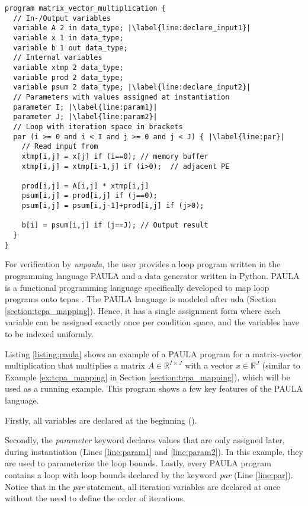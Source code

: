 \begin{lstlisting}[style=my_PAULA_style, float, escapechar=|, label=listing:paula, captionpos=b,
  caption=PAULA Code multiplying a matrix $A \in \mathbb{R}^{I \times J}$ with a vector $x \in \mathbb{R}^J$ and storing the result in vector $b \in \mathbb{R}^I$.]
program matrix_vector_multiplication {
  // In-/Output variables
  variable A 2 in data_type; |\label{line:declare_input1}|  
  variable x 1 in data_type;  
  variable b 1 out data_type; 
  // Internal variables
  variable xtmp 2 data_type;
  variable prod 2 data_type;
  variable psum 2 data_type; |\label{line:declare_input2}|  
  // Parameters with values assigned at instantiation
  parameter I; |\label{line:param1}|  
  parameter J; |\label{line:param2}| 
  // Loop with iteration space in brackets
  par (i >= 0 and i < I and j >= 0 and j < J) { |\label{line:par}|
    // Read input from
    xtmp[i,j] = x[j] if (i==0); // memory buffer
    xtmp[i,j] = xtmp[i-1,j] if (i>0);  // adjacent PE

    prod[i,j] = A[i,j] * xtmp[i,j]  
    psum[i,j] = prod[i,j] if (j==0);
    psum[i,j] = psum[i,j-1]+prod[i,j] if (j>0);

    b[i] = psum[i,j] if (j==J); // Output result
  }
}
\end{lstlisting}

For verification by \textit{unpaula}, the user provides a loop program written in the programming language PAULA and a data generator written in Python.
PAULA is a functional programming language specifically developed to map loop programs onto \acp{tcpa} \cite{14_PAULA}.
The PAULA language is modeled after \ac{uda} (Section \ref{section:tcpa_mapping}).
Hence, it has a single assignment form where each variable can be assigned exactly once per condition space, and the variables have to be indexed uniformly.

Listing \ref{listing:paula} shows an example of a PAULA program for a matrix-vector multiplication that multiplies a matrix $A \in \mathbb{R}^{I \times J}$ with a vector $x \in \mathbb{R}^J$ (similar to Example \ref{ex:tcpa_mapping} in Section \ref{section:tcpa_mapping}), which will be used as a running example.
This program shows a few key features of the PAULA language.


Firstly, all variables are declared at the beginning ().

Secondly, the \textit{parameter} keyword declares values that are only assigned later, during instantiation (Lines \ref{line:param1} and \ref{line:param2}).
In this example, they are used to parameterize the loop bounds.
Lastly, every PAULA program contains a loop with loop bounds declared by the keyword \textit{par} (Line \ref{line:par}).
Notice that in the \textit{par} statement, all iteration variables are declared at once without the need to define the order of iterations.

